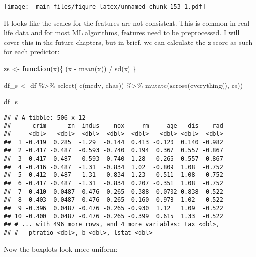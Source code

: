 \documentclass[
]{book}
\newenvironment{Shaded}{\begin{snugshade}}{\end{snugshade}}
\newcommand{\ControlFlowTok}[1]{\textcolor[rgb]{0.13,0.29,0.53}{\textbf{#1}}}
\newcommand{\FunctionTok}[1]{\textcolor[rgb]{0.00,0.00,0.00}{#1}}
\newcommand{\NormalTok}[1]{#1}
\newcommand{\OtherTok}[1]{\textcolor[rgb]{0.56,0.35,0.01}{#1}}
\newcommand{\SpecialCharTok}[1]{\textcolor[rgb]{0.00,0.00,0.00}{#1}}
\begin{document}
\texttt{[image: \_main\_files/figure-latex/unnamed-chunk-153-1.pdf]}

It looks like the scales for the features are not consistent. This is common in real-life data and for most ML algorithms, features need to be preprocessed. I will cover this in the future chapters, but in brief, we can calculate the z-score as such for each predictor:

\begin{Shaded}
\begin{Highlighting}[]
\NormalTok{zs }\OtherTok{\textless{}{-}} \ControlFlowTok{function}\NormalTok{(x)\{}
\NormalTok{  (x }\SpecialCharTok{{-}} \FunctionTok{mean}\NormalTok{(x)) }\SpecialCharTok{/} \FunctionTok{sd}\NormalTok{(x)}
\NormalTok{\}}

\NormalTok{df\_s }\OtherTok{\textless{}{-}}\NormalTok{ df }\SpecialCharTok{\%\textgreater{}\%} \FunctionTok{select}\NormalTok{(}\SpecialCharTok{{-}}\FunctionTok{c}\NormalTok{(medv, chas)) }\SpecialCharTok{\%\textgreater{}\%}
  \FunctionTok{mutate}\NormalTok{(}\FunctionTok{across}\NormalTok{(}\FunctionTok{everything}\NormalTok{(), zs))}

\NormalTok{df\_s}
\end{Highlighting}
\end{Shaded}

\begin{verbatim}
## # A tibble: 506 x 12
##      crim      zn  indus    nox     rm     age   dis    rad
##     <dbl>   <dbl>  <dbl>  <dbl>  <dbl>   <dbl> <dbl>  <dbl>
##  1 -0.419  0.285  -1.29  -0.144  0.413 -0.120  0.140 -0.982
##  2 -0.417 -0.487  -0.593 -0.740  0.194  0.367  0.557 -0.867
##  3 -0.417 -0.487  -0.593 -0.740  1.28  -0.266  0.557 -0.867
##  4 -0.416 -0.487  -1.31  -0.834  1.02  -0.809  1.08  -0.752
##  5 -0.412 -0.487  -1.31  -0.834  1.23  -0.511  1.08  -0.752
##  6 -0.417 -0.487  -1.31  -0.834  0.207 -0.351  1.08  -0.752
##  7 -0.410  0.0487 -0.476 -0.265 -0.388 -0.0702 0.838 -0.522
##  8 -0.403  0.0487 -0.476 -0.265 -0.160  0.978  1.02  -0.522
##  9 -0.396  0.0487 -0.476 -0.265 -0.930  1.12   1.09  -0.522
## 10 -0.400  0.0487 -0.476 -0.265 -0.399  0.615  1.33  -0.522
## # ... with 496 more rows, and 4 more variables: tax <dbl>,
## #   ptratio <dbl>, b <dbl>, lstat <dbl>
\end{verbatim}

Now the boxplots look more uniform:
\end{document}
